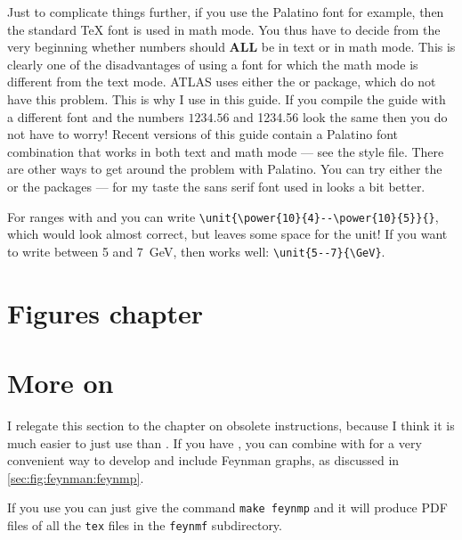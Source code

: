 Just to complicate things further, if you use the Palatino font for
example, then the standard \TeX{} font is used in math mode. You thus
have to decide from the very beginning whether numbers should
\textbf{ALL} be in text or in math mode. This is clearly one of the
disadvantages of using a font for which the math mode is different
from the text mode. ATLAS uses either the  or  package,
which do not have this problem.
This is why I use  in this guide.
If you compile the guide
with a different font and the numbers \(1234.56\) and 1234.56 look the
same then you do not have to worry!
Recent versions of this guide contain a Palatino font combination that works in both
text and math mode --- see the style file.
There are other ways to get around the problem with Palatino.
You can try either the  or the
 packages --- for my taste the sans serif font used
in  looks a bit better.

For ranges with  and  you can write
\verb+\unit{\power{10}{4}--\power{10}{5}}{}+, which would look almost
correct, but leaves some space for the unit! If you want to write
between 5 and \SI{7}{\GeV}, then  works well:
\verb+\unit{5--7}{\GeV}+.



\section*{Figures chapter}%
\label{sec:app:figs}

\section{More on }%
\label{sec:app:fig:feynman:feynmf}

I relegate this section to the chapter on obsolete instructions,
because I think it is much easier to just use  than .
If you have , you can combine
 with  for a very convenient way
to develop and include Feynman graphs, as discussed in
\cref{sec:fig:feynman:feynmp}.

If you use  you can just give the command \texttt{make
feynmp} and it will produce PDF files of all the \texttt{tex} files in
the \texttt{feynmf} subdirectory.

